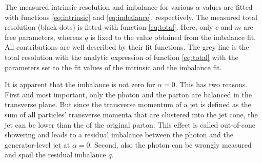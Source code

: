 The measured intrinsic resolution and imbalance for various $\alpha$ values are fitted with functions \eqref{eq:intrinsic} and \eqref{eq:imbalance}, respectively.
The measured total resolution (black dots) is fitted with function \eqref{eq:total}. Here, only $c$ and $m$ are free parameters, 
whereas $q$ is fixed to the value obtained from the imbalance fit. 
All contributions are well described by their fit functions. 
The grey line is the total resolution with the analytic expression of function \eqref{eq:total} with the parameters set to the fit values of the intrinsic and the imbalance fit. 

It is apparent that the imbalance is not zero for $\alpha=0$. 
This has two reasons.
First and most important, only the photon and the parton are balanced in the transverse plane.
But since the transverse momentum of a jet is defined as the sum of all particles' transverse momenta that are clustered into the jet cone, the jet \pt can be lower than the \pt of the original parton.
This effect is called out-of-cone showering and leads to a residual imbalance between the photon \pt and the generator-level jet \pt at $\alpha=0$.
Second, also the photon \pt can be wrongly measured and spoil the residual imbalance $q$. 

